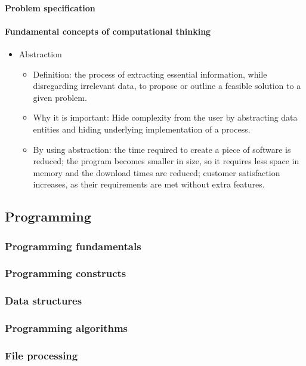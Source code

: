 \paragraph{Problem specification}
\paragraph{Fundamental concepts of computational thinking}
\begin{itemize}
    \item Abstraction
    \begin{itemize}
        \item Definition: the process of extracting essential information, while disregarding irrelevant data, to propose or outline a feasible solution to a given problem.
        \item Why it is important: Hide complexity from the user by abstracting data entities and hiding underlying implementation of a process.
        \item By using abstraction: the time required to create a piece of software is reduced; the program becomes smaller in size, so it requires less space in memory and the download times are reduced; customer satisfaction increases, as their requirements are met without extra features. 
    \end{itemize}
\end{itemize}

\subsection{Programming}
\subsubsection{Programming fundamentals}
\subsubsection{Programming constructs}
\subsubsection{Data structures}
\subsubsection{Programming algorithms}
\subsubsection{File processing}
